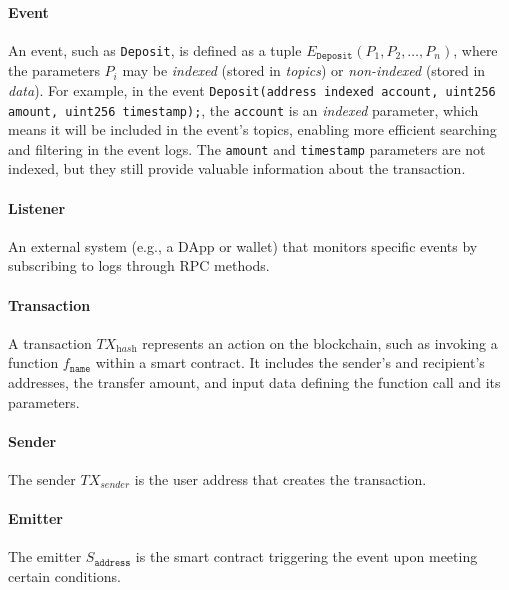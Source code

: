 \paragraph{Event}
An event, such as \texttt{Deposit}, is defined as a tuple $E_{\texttt{Deposit}}(P_1, P_2, \ldots, P_n)$, where the parameters $P_i$ may be \textit{indexed} (stored in \textit{topics}) or \textit{non-indexed} (stored in \textit{data}). For example, in the event
\texttt{Deposit(address indexed account, uint256 amount, uint256 timestamp);},
the \texttt{account} is an \textit{indexed} parameter, which means it will be included in the event's topics, enabling more efficient searching and filtering in the event logs. The \texttt{amount} and \texttt{timestamp} parameters are not indexed, but they still provide valuable information about the transaction.


\paragraph{Listener}
An external system (e.g., a DApp or wallet) that monitors specific events by subscribing to logs through RPC methods.

\paragraph{Transaction}
A transaction $TX_{\textit{hash}}$ represents an action on the blockchain, such as invoking a function $f_{\texttt{name}}$ within a smart contract. It includes the sender’s and recipient’s addresses, the transfer amount, and input data defining the function call and its parameters.


\paragraph{Sender}
The sender \( TX_{\textit{sender}} \) is the user address that creates the transaction.

\paragraph{Emitter}
The emitter $S_{\texttt{address}}$ is the smart contract triggering the event upon meeting certain conditions.

